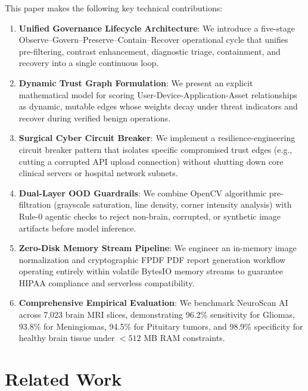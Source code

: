 \documentclass[conference]{IEEEtran}
\begin{document}
This paper makes the following key technical contributions:
\begin{enumerate}
    \item \textbf{Unified Governance Lifecycle Architecture}: We introduce a five-stage Observe--Govern--Preserve--Contain--Recover operational cycle that unifies pre-filtering, contrast enhancement, diagnostic triage, containment, and recovery into a single continuous loop.
    \item \textbf{Dynamic Trust Graph Formulation}: We present an explicit mathematical model for scoring User-Device-Application-Asset relationships as dynamic, mutable edges whose weights decay under threat indicators and recover during verified benign operations.
    \item \textbf{Surgical Cyber Circuit Breaker}: We implement a resilience-engineering circuit breaker pattern that isolates specific compromised trust edges (e.g., cutting a corrupted API upload connection) without shutting down core clinical servers or hospital network subnets.
    \item \textbf{Dual-Layer OOD Guardrails}: We combine OpenCV algorithmic pre-filtration (grayscale saturation, line density, corner intensity analysis) with Rule-0 agentic checks to reject non-brain, corrupted, or synthetic image artifacts before model inference.
    \item \textbf{Zero-Disk Memory Stream Pipeline}: We engineer an in-memory image normalization and cryptographic FPDF PDF report generation workflow operating entirely within volatile BytesIO memory streams to guarantee HIPAA compliance and serverless compatibility.
    \item \textbf{Comprehensive Empirical Evaluation}: We benchmark NeuroScan AI across 7,023 brain MRI slices, demonstrating 96.2\% sensitivity for Gliomas, 93.8\% for Meningiomas, 94.5\% for Pituitary tumors, and 98.9\% specificity for healthy brain tissue under $< 512$ MB RAM constraints.
\end{enumerate}

\section{Related Work}
\end{document}
